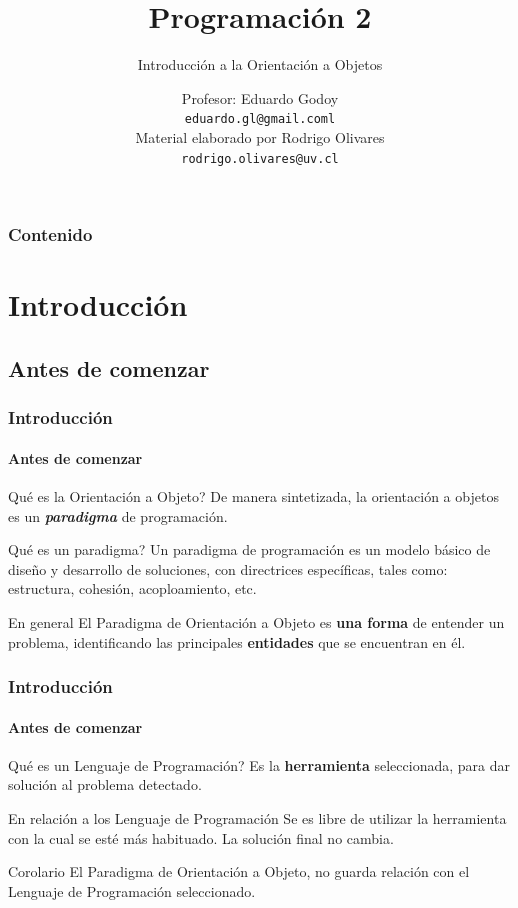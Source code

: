 \documentclass{beamer}
\title[\textbf{Programaci\'on 2}]{\textbf{Programaci\'on 2}}
\subtitle{Introducci\'on a la Orientaci\'on a Objetos}
\author[Eduardo Godoy]
{
	Profesor: Eduardo Godoy \\
	\vspace{0.5mm}
	\texttt{\normalsize eduardo.gl@gmail.coml} \\ 
	Material elaborado por Rodrigo Olivares \\
	\texttt{\normalsize rodrigo.olivares@uv.cl} \\
}
\institute[Universidad de Valpara\'iso]
\begin{document}
	\begin{frame}
		\titlepage
	\end{frame}

	\begin{frame}
		\frametitle{Contenido}
		\tableofcontents%
	\end{frame}
	
	\section{Introducci\'on}

		\subsection{Antes de comenzar}

		\begin{frame}
			\frametitle{Introducci\'on}
			\framesubtitle{Antes de comenzar}

			\begin{block}{\textquestiondown Qu\'e es la Orientaci\'on a Objeto?}
  				De manera sintetizada, la orientaci\'on a  objetos es un \textbf{{\em paradigma}} de programaci\'on.
			\end{block}
			\begin{block}{\textquestiondown Qu\'e es un paradigma?}
  				Un paradigma de programaci\'on es un modelo b\'asico de dise\~no y desarrollo de soluciones, con directrices espec\'ificas, tales como: estructura, cohesi\'on, acoploamiento, etc.
			\end{block}
			\begin{exampleblock}{En general}
  				El Paradigma de Orientaci\'on a Objeto es \textbf{una forma} de entender un problema, identificando las principales \textbf{entidades} que se encuentran en \'el.
			\end{exampleblock}
		\end{frame}

		\begin{frame}
			\frametitle{Introducci\'on}
			\framesubtitle{Antes de comenzar}

			\begin{block}{\textquestiondown Qu\'e es un Lenguaje de Programaci\'on?}
  				Es la \textbf{herramienta} seleccionada, para dar soluci\'on al problema detectado.
			\end{block}
			\begin{block}{En relaci\'on a los Lenguaje de Programaci\'on}
  				Se es libre de utilizar la herramienta con la cual se est\'e m\'as habituado. La soluci\'on final no cambia.
			\end{block}
			\begin{exampleblock}{Corolario}
  				El Paradigma de Orientaci\'on a Objeto, no guarda relaci\'on con el Lenguaje de Programaci\'on seleccionado.
			\end{exampleblock}
		\end{frame}
\end{document}
